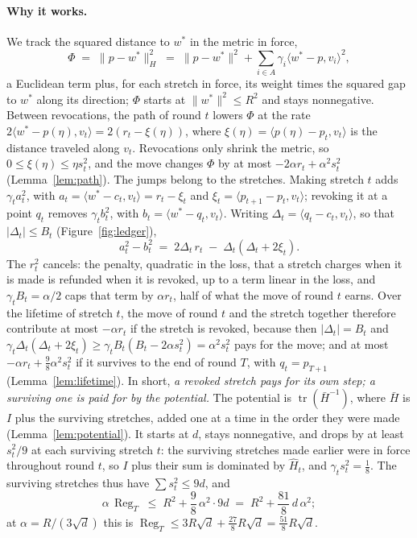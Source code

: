 \documentclass[11pt]{article}
\theoremstyle{plain}
\theoremstyle{definition}
\theoremstyle{remark}
\DeclareMathOperator{\tr}{tr}
\DeclareMathOperator{\Reg}{Reg}
\newcommand{\wstar}{w^{\ast}}
\newcommand{\ip}[2]{\langle #1, #2\rangle}
\begin{document}
\paragraph{Why it works.} We track the squared distance to $\wstar$ in the metric in force,
\[
  \Phi\;=\;\|p-\wstar\|_{H}^{2}\;=\;\|p-\wstar\|^{2}+\sum_{i\in A}\gamma_i\ip{\wstar-p}{v_i}^{2} ,
\]
a Euclidean term plus, for each stretch in force, its weight times the squared gap to $\wstar$ along
its direction; $\Phi$ starts at $\|\wstar\|^{2}\le R^{2}$ and stays nonnegative. Between
revocations, the path of round $t$ lowers $\Phi$ at the rate
$2\ip{\wstar-p(\eta)}{v_t}=2(r_t-\xi(\eta))$, where $\xi(\eta)=\ip{p(\eta)-p_t}{v_t}$ is the
distance traveled along $v_t$. Revocations only shrink the metric, so
$0\le\xi(\eta)\le\eta s_t^{2}$, and the move changes $\Phi$ by at most
$-2\alpha r_t+\alpha^{2}s_t^{2}$ (Lemma~\ref{lem:path}). The jumps belong to the stretches. Making
stretch $t$ adds $\gamma_ta_t^{2}$, with $a_t=\ip{\wstar-c_t}{v_t}=r_t-\xi_t$ and
$\xi_t=\ip{p_{t+1}-p_t}{v_t}$; revoking it at a point $q_t$ removes $\gamma_tb_t^{2}$, with
$b_t=\ip{\wstar-q_t}{v_t}$. Writing $\Delta_t=\ip{q_t-c_t}{v_t}$, so that $|\Delta_t|\le B_t$
(Figure~\ref{fig:ledger}),
\[
  a_t^{2}-b_t^{2}\;=\;2\Delta_t\,r_t\;-\;\Delta_t(\Delta_t+2\xi_t) .
\]
The $r_t^{2}$ cancels: the penalty, quadratic in the loss, that a stretch charges when it is made is
refunded when it is revoked, up to a term linear in the loss, and $\gamma_tB_t=\alpha/2$ caps that
term by $\alpha r_t$, half of what the move of round $t$ earns. Over the lifetime of stretch $t$,
the move of round $t$ and the stretch together therefore contribute at most $-\alpha r_t$ if the
stretch is revoked, because then $|\Delta_t|=B_t$ and
$\gamma_t\Delta_t(\Delta_t+2\xi_t)\ge\gamma_tB_t(B_t-2\alpha s_t^{2})=\alpha^{2}s_t^{2}$ pays for
the move; and at most $-\alpha r_t+\tfrac98\alpha^{2}s_t^{2}$ if it survives to the end of round $T$,
with $q_t=p_{T+1}$ (Lemma~\ref{lem:lifetime}). In short, \emph{a revoked stretch pays for its own
step; a surviving one is paid for by the potential.} The potential is $\tr(\bar H^{-1})$, where
$\bar H$ is $I$ plus the surviving stretches, added one at a time in the order they were made
(Lemma~\ref{lem:potential}). It starts at $d$, stays nonnegative, and drops by at least $s_t^{2}/9$
at each surviving stretch $t$: the surviving stretches made earlier were in force throughout round
$t$, so $I$ plus their sum is dominated by $\hat H_t$, and $\gamma_ts_t^{2}=\tfrac18$. The surviving
stretches thus have $\sum s_t^{2}\le9d$, and
\[
  \alpha\,\Reg_T\;\le\;R^{2}+\frac98\,\alpha^{2}\cdot9d\;=\;R^{2}+\frac{81}{8}\,d\,\alpha^{2} ;
\]
at $\alpha=R/(3\sqrt d)$ this is $\Reg_T\le3R\sqrt d+\tfrac{27}{8}R\sqrt d=\tfrac{51}{8}R\sqrt d$.
\end{document}
